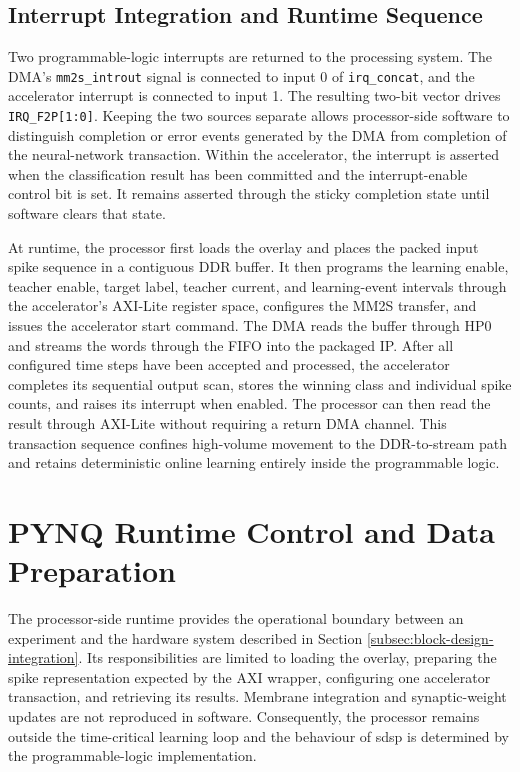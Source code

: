 \subsection{Interrupt Integration and Runtime Sequence}

Two programmable-logic interrupts are returned to the processing system. The DMA's \texttt{mm2s\_introut} signal is connected to input 0 of \texttt{irq\_concat}, and the accelerator interrupt is connected to input 1. The resulting two-bit vector drives \texttt{IRQ\_F2P[1:0]}. Keeping the two sources separate allows processor-side software to distinguish completion or error events generated by the DMA from completion of the neural-network transaction. Within the accelerator, the interrupt is asserted when the classification result has been committed and the interrupt-enable control bit is set. It remains asserted through the sticky completion state until software clears that state.

At runtime, the processor first loads the overlay and places the packed input spike sequence in a contiguous DDR buffer. It then programs the learning enable, teacher enable, target label, teacher current, and learning-event intervals through the accelerator's AXI-Lite register space, configures the MM2S transfer, and issues the accelerator start command. The DMA reads the buffer through HP0 and streams the words through the FIFO into the packaged IP. After all configured time steps have been accepted and processed, the accelerator completes its sequential output scan, stores the winning class and individual spike counts, and raises its interrupt when enabled. The processor can then read the result through AXI-Lite without requiring a return DMA channel. This transaction sequence confines high-volume movement to the DDR-to-stream path and retains deterministic online learning entirely inside the programmable logic.

\section{PYNQ Runtime Control and Data Preparation}
\label{subsec:pynq-runtime-control}

The processor-side runtime provides the operational boundary between an experiment and the hardware system described in Section \ref{subsec:block-design-integration}. Its responsibilities are limited to loading the overlay, preparing the spike representation expected by the AXI wrapper, configuring one accelerator transaction, and retrieving its results. Membrane integration and synaptic-weight updates are not reproduced in software. Consequently, the processor remains outside the time-critical learning loop and the behaviour of \gls{sdsp} is determined by the programmable-logic implementation.

